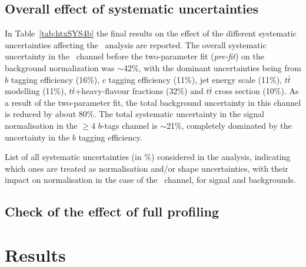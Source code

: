 
\subsection{Overall effect of systematic uncertainties}\label{sec:htxALLSYS}

In Table~\ref{tab:htxSYS4b} the final results on
the effect of the different systematic uncertainties affecting
the \htx\ analysis are reported.
The overall systematic uncertainty in the \chiv\ channel
before the two-parameter fit ({\it pre-fit})
on the background normalization was
$\sim$42\%, with the dominant uncertainties being from $b$ tagging efficiency (16\%),
$c$ tagging efficiency (11\%), jet energy scale (11\%), $t\bar{t}$ modelling (11\%), 
$t\bar{t}$+heavy-flavour fractions (32\%) and $t\bar{t}$ cross section (10\%).
As a result of the two-parameter fit, the total background uncertainty 
in this channel is reduced 
by about 80\%. The total  systematic uncertainty
in the signal normalisation in the $\geq 4$ $b$-tags channel is 
$\sim$21\%, completely dominated by the uncertainty in the $b$ tagging efficiency.


\begin{table}[h!tb]
\begin{center}
\resizebox{1.\textwidth}{!}{
}
\caption{List of all systematic uncertainties (in \%) considered in the analysis, indicating which ones are treated
as normalisation and/or shape uncertainties, with their impact on normalisation in the case of the 
\chiv\ channel, for signal and backgrounds. \label{tab:htxSYS4b} }
\end{center}
\end{table}



\subsection{Check of the effect of full profiling}\label{sec:fullprof}



\section{Results}\label{sec:htxRES}


